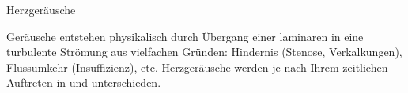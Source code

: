  
{Herzgeräusche}
{%
% 
%
Geräusche entstehen physikalisch durch Übergang einer
laminaren in eine turbulente Strömung aus vielfachen Gründen:
Hindernis (Stenose, Verkalkungen), Flussumkehr
(Insuffizienz), etc. Herzgeräusche werden je nach Ihrem
zeitlichen Auftreten  in  und 
unterschieden.

% 
%
%   
%   
}
{\MoveDown}
{}
{}
{}




